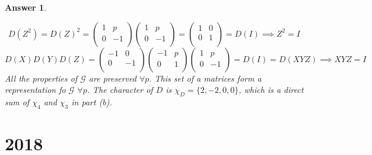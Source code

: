 \documentclass[a4paper]{article}
\newtheorem{ans}{Answer}[section]
\theoremstyle{new}
\begin{document}
\begin{ans}
\begin{enumerate}[label=(\alph*)]
$$D(Z^2)=D(Z)^2=\begin{pmatrix}1&p\\0&-1\\\end{pmatrix}\begin{pmatrix}1&p\\0&-1\\\end{pmatrix}=\begin{pmatrix}1&0\\0&1\\\end{pmatrix}=D(I)\implies Z^2=I$$
$$D(X)D(Y)D(Z)=\begin{pmatrix}-1&0\\0&-1\\\end{pmatrix}\begin{pmatrix}-1&p\\0&1\\\end{pmatrix}\begin{pmatrix}1&p\\0&-1\\\end{pmatrix}=D(I)=D(XYZ)\implies XYZ=I$$
All the properties of $\mathcal{G}$ are preserved $\forall p$. This set of a matrices form a representation fo $\mathcal{G}$ $\forall p$. The character of $D$ is $\chi_D=\{2,-2,0,0\}$, which is a direct sum of $\chi_4$ and $\chi_3$ in part (b).
\end{enumerate}
\end{ans}
\newpage
\section{2018}
\end{document}
